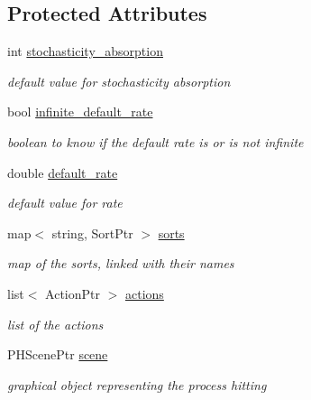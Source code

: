 \subsection*{\-Protected \-Attributes}
\begin{DoxyCompactItemize}
\item 
\hypertarget{class_p_h_abdd55c7db00c19b89de0afba20d97b24}{int \hyperlink{class_p_h_abdd55c7db00c19b89de0afba20d97b24}{stochasticity\-\_\-absorption}}\label{class_p_h_abdd55c7db00c19b89de0afba20d97b24}

\begin{DoxyCompactList}\small\item\em default value for stochasticity absorption \end{DoxyCompactList}\item 
bool \hyperlink{class_p_h_aa66efaf095a379c3b108a023d7c98afa}{infinite\-\_\-default\-\_\-rate}
\begin{DoxyCompactList}\small\item\em boolean to know if the default rate is or is not infinite \end{DoxyCompactList}\item 
\hypertarget{class_p_h_a7a9525bc83257efefbaf9e78d96723ca}{double \hyperlink{class_p_h_a7a9525bc83257efefbaf9e78d96723ca}{default\-\_\-rate}}\label{class_p_h_a7a9525bc83257efefbaf9e78d96723ca}

\begin{DoxyCompactList}\small\item\em default value for rate \end{DoxyCompactList}\item 
\hypertarget{class_p_h_a889cc129633e88e4257f56dec04c5bac}{map$<$ string, \-Sort\-Ptr $>$ \hyperlink{class_p_h_a889cc129633e88e4257f56dec04c5bac}{sorts}}\label{class_p_h_a889cc129633e88e4257f56dec04c5bac}

\begin{DoxyCompactList}\small\item\em map of the sorts, linked with their names \end{DoxyCompactList}\item 
\hypertarget{class_p_h_a730f2eb0cd79487213cac9565d746a05}{list$<$ \-Action\-Ptr $>$ \hyperlink{class_p_h_a730f2eb0cd79487213cac9565d746a05}{actions}}\label{class_p_h_a730f2eb0cd79487213cac9565d746a05}

\begin{DoxyCompactList}\small\item\em list of the actions \end{DoxyCompactList}\item 
\hypertarget{class_p_h_ac8fbe29746ee4097c879be0cf75f3ad7}{\-P\-H\-Scene\-Ptr \hyperlink{class_p_h_ac8fbe29746ee4097c879be0cf75f3ad7}{scene}}\label{class_p_h_ac8fbe29746ee4097c879be0cf75f3ad7}

\begin{DoxyCompactList}\small\item\em graphical object representing the process hitting \end{DoxyCompactList}\end{DoxyCompactItemize}


